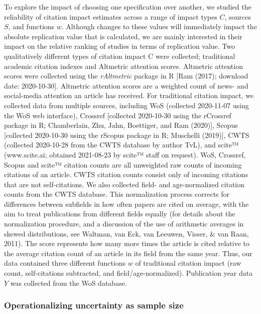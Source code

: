 \documentclass[
  man,floatsintext]{apa6}
\begin{document}
To explore the impact of choosing one specification over another, we studied the reliability of citation impact estimates across a range of impact types \(C\), sources \(S\), and functions \(w\). Although changes to these values will immediately impact the absolute replication value that is calculated, we are mainly interested in their impact on the relative ranking of studies in terms of replication value. Two qualitatively different types of citation impact C were collected; traditional academic citation indexes and Altmetric attention scores. Altmetric attention scores were collected using the \emph{rAltmetric} package in R {[}Ram (2017); download date: 2020-10-30{]}. Altmetric attention scores are a weighted count of news- and social-media attention an article has received. For traditional citation impact, we collected data from multiple sources, including WoS (collected 2020-11-07 using the WoS web interface), Crossref {[}collected 2020-10-30 using the rCrossref package in R; Chamberlain, Zhu, Jahn, Boettiger, and Ram (2020){]}, Scopus {[}collected 2020-10-30 using the rScopus package in R; Muschelli (2019){]}, CWTS (collected 2020-10-28 from the CWTS database by author TvL), and scite™ (www.scite.ai; obtained 2021-08-23 by scite™ staff on request). WoS, Crossref, Scopus and scite™ citation counts are all unweighted raw counts of incoming citations of an article. CWTS citation counts consist only of incoming citations that are not self-citations. We also collected field- and age-normalized citation counts from the CWTS database. This normalization process corrects for differences between subfields in how often papers are cited on average, with the aim to treat publications from different fields equally (for details about the normalization procedure, and a discussion of the use of arithmetic averages in skewed distributions, see Waltman, van Eck, van Leeuwen, Visser, \& van Raan, 2011). The score represents how many more times the article is cited relative to the average citation count of an article in its field from the same year. Thus, our data contained three different functions \(w\) of traditional citation impact (raw count, self-citations subtracted, and field/age-normalized). Publication year data \(Y\) was collected from the WoS database.

\hypertarget{operationalizing-uncertainty-as-sample-size}{%
\subsubsection{Operationalizing uncertainty as sample size}\label{operationalizing-uncertainty-as-sample-size}}
\end{document}
